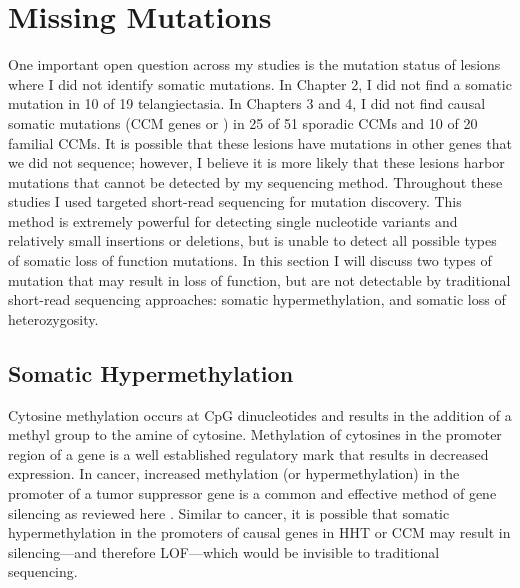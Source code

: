 \section{Missing Mutations}
One important open question across my studies is the mutation status of lesions where I did not identify somatic mutations. In Chapter 2, I did not find a somatic mutation in 10 of 19 telangiectasia. In Chapters 3 and 4, I did not find causal somatic mutations (CCM genes or ) in 25 of 51 sporadic CCMs and 10 of 20 familial CCMs. It is possible that these lesions have mutations in other genes that we did not sequence; however, I believe it is more likely that these lesions harbor mutations that cannot be detected by my sequencing method. Throughout these studies I used targeted short-read sequencing for mutation discovery. This method is extremely powerful for detecting single nucleotide variants and relatively small insertions or deletions, but is unable to detect all possible types of somatic loss of function mutations. In this section I will discuss two types of mutation that may result in loss of function, but are not detectable by traditional short-read sequencing approaches: somatic hypermethylation, and somatic loss of heterozygosity. 

\subsection{Somatic Hypermethylation}
Cytosine methylation occurs at CpG dinucleotides and results in the addition of a methyl group  to the amine of cytosine.  Methylation of cytosines in the promoter region of a gene is a well established regulatory mark that results in decreased expression. In cancer, increased methylation (or hypermethylation) in the promoter of a tumor suppressor gene is a common and effective method of gene silencing as reviewed here \citep{baylin2005}. Similar to cancer, it is possible that somatic hypermethylation in the promoters of causal genes in HHT or CCM may result in silencing---and therefore LOF---which would be invisible to traditional sequencing.

